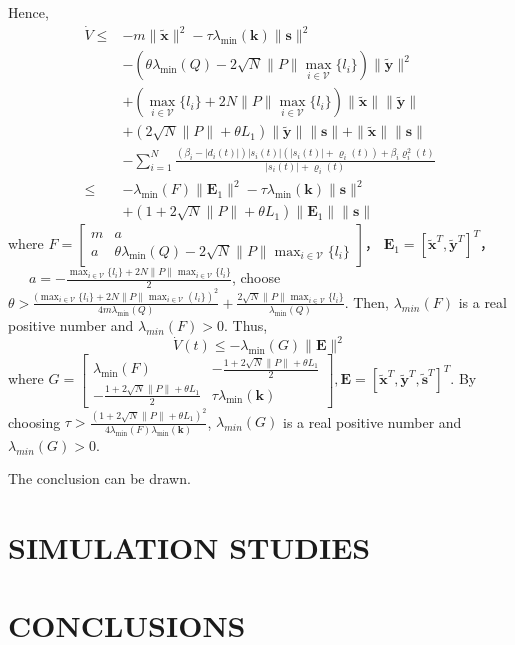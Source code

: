 \documentclass[lettersize,journal]{IEEEtran}
\begin{document}
Hence,
\begin{equation}
    \begin{aligned}
        \dot{V}\leq & -m\|\tilde{\mathbf{x}}\|^2-\tau\lambda_{\min}(\mathbf{k})\|\mathbf{s}\|^2                                                    \\
                    & -(\theta\lambda_{\min}(Q)-2\sqrt{N}\|P\|\max_{i\in\mathcal{V}}\{l_i\})\|\tilde{\mathbf{y}}\|^2                               \\
                    & +(\max_{i\in\mathcal{V}}\{l_i\}+2N\|P\|\max_{i\in\mathcal{V}}\{l_i\})\|\tilde{\mathbf{x}}\|\|\tilde{\mathbf{y}}\|            \\
                    & +(2\sqrt{N}\|P\|+\theta L_{1})\|\tilde{\mathbf{y}}\|\|\mathbf{s}\|+\|\tilde{\mathbf{x}}\|\|\mathbf{s}\|                      \\
                    & -\sum_{i = 1}^{N}\frac{(\beta_i - |d_i(t)|)|s_i(t)|(|s_i(t)|+\varrho_i(t)) + \beta_i\varrho_i^2(t)}{|s_i(t)| + \varrho_i(t)} \\
        \leq        & -\lambda_{\min}(F)\|\mathbf{E}_1\|^2-\tau\lambda_{\min}(\mathbf{k})\|\mathbf{s}\|^2                                          \\
                    & +(1+2\sqrt{N}\|P\|+\theta L_1)\|\mathbf{E}_1\|\|\mathbf{s}\|
    \end{aligned}
\end{equation}
where $\left.F=\left[\begin{array}{cc}m & a                                                                   \\
             a     & \theta\lambda_{\min}(Q)-2\sqrt{N}\|P\|\max_{i\in\mathcal{V}}\{l_i\}\end{array}\right.\right]$，
$\mathbf{E}_1 = [\tilde{\mathbf{x}}^T,\tilde{\mathbf{y}}^T]^T$，
~~~$a = -\frac{\max_{i\in\mathcal{V}}\{l_{i}\}+2N\|P\|\max_{i\in\mathcal{V}}\{l_{i}\}}{2}$, choose
$\theta > \frac{(\max_{i\in\mathcal{V}}\{l_{i}\}+2N\|P\|\max_{i\in\mathcal{V}}(l_{i}\})^{2}}{4m\lambda_{\mathrm{min}}(Q)}+\frac{2\sqrt{N}\|P\|\max_{i\in\mathcal{V}}\{l_{i}\}}{\lambda_{\mathrm{min}}(Q)}$. Then, $\lambda_{min}(F)$ is a real positive number and $\lambda_{min}(F) > 0$. Thus,
\begin{equation}
    \dot{V}(t) \leq -\lambda_{\min}(G)\|\mathbf{E}\|^2
\end{equation}
where $\left.G=\left[\begin{array}{cc}\lambda_{\min}(F)&-\frac{1+2\sqrt{N}\|P\|+\theta L_1}2\\-\frac{1+2\sqrt{N}\|P\|+\theta L_1}2&\tau\lambda_{\min}(\mathbf{k})\end{array}\right.\right],
    \mathbf{E} = [\tilde{\mathbf{x}}^T,\tilde{\mathbf{y}}^T,\tilde{\mathbf{s}}^T]^T$. By choosing
$\tau>\frac{(1+2\sqrt{N}\|P\|+\theta L_{1})^{2}}{4\lambda_{\mathrm{min}}(F)\lambda_{\mathrm{min}}(\mathbf{k})}$, $\lambda_{min}(G)$ is a real positive number and $\lambda_{min}(G) > 0$.

The conclusion can be drawn.

\section{SIMULATION STUDIES}

\section{CONCLUSIONS}






\end{document}
